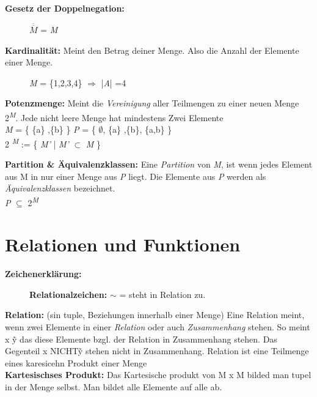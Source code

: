 \textbf{Gesetz der Doppelnegation:}\\
\begin{figure}[H]
\centering
$\overline{\overline{M}}$ = \textit{M}
\end{figure}


\textbf{Kardinalität:} Meint den Betrag deiner Menge. Also die Anzahl der Elemente einer Menge.\\
\begin{figure}[H]
\centering
\textit{M} = \{1,2,3,4\}  $\Rightarrow$ |\textit{A}| =4\\
\end{figure}

\textbf{Potenzmenge:} Meint die \textit{Vereinigung} aller Teilmengen zu einer neuen Menge 2\textsuperscript{\textit{M}}. Jede nicht leere Menge hat mindestens Zwei Elemente\\

\textit{M} = \{ \{a\}  ,\{b\} \}
\textit{P} = \{ $\emptyset$, \{a\}  ,\{b\}, \{a,b\} \}\\
2\textsuperscript{ \textit{M}} := \{ \textit{M'} | \textit{M'} $\subset$ \textit{M} \}


\textbf{Partition \& Äquivalenzklassen:} Eine \textit{Partition} von \textit{M}, ist wenn jedes Element aus M in nur einer Menge aus \textit{P} liegt. Die Elemente aus \textit{P} werden als \textit{Äquivalenzklassen} bezeichnet.\\
\textit{P} $\subseteq$ 2\textsuperscript{\textit{M}}

\section{Relationen und Funktionen}

\textbf{Zeichenerklärung:}\\
\begin{figure}[h]
\centering
\textbf{Relationalzeichen:} \textit{$\sim$} = steht in Relation zu.\\
\end{figure}

\textbf{Relation:} (sin tuple, Beziehungen innerhalb einer Menge) Eine Relation meint, wenn zwei Elemente in einer \textit{Relation} oder auch \textit{Zusammenhang} stehen. So meint x \~ y das diese Elemente bzgl. der Relation in Zusammenhang stehen. Das Gegenteil x NICHT\~ y stehen nicht in Zusammenhang. Relation ist eine Teilmenge eines karesicehn Produkt einer Menge\\

\textbf{Kartesischses Produkt:} Das Kartesische produkt von M x M bilded man tupel in der Menge selbst. Man bildet alle Elemente auf alle ab. 

